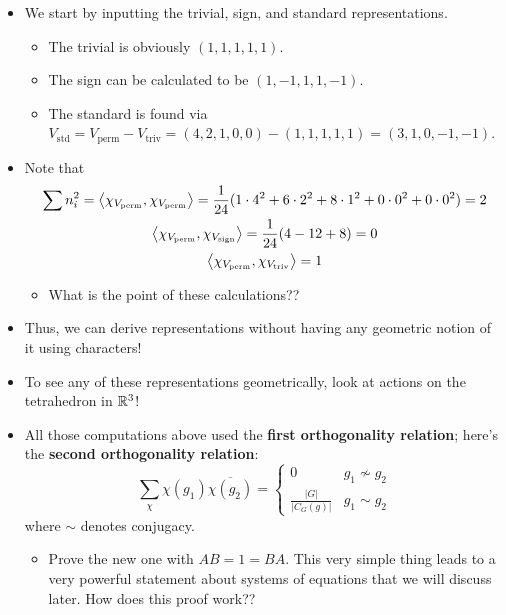 \documentclass[../notes.tex]{subfiles}
\begin{document}
\begin{itemize}
\begin{itemize}
\begin{itemize}
        \end{itemize}
        \item We start by inputting the trivial, sign, and standard representations.
        \begin{itemize}
            \item The trivial is obviously $(1,1,1,1,1)$.
            \item The sign can be calculated to be $(1,-1,1,1,-1)$.
            \item The standard is found via $V_\text{std}=V_\text{perm}-V_\text{triv}=(4,2,1,0,0)-(1,1,1,1,1)=(3,1,0,-1,-1)$.
        \end{itemize}
        \item Note that
        \begin{gather*}
            \sum n_i^2 = \left\langle{\chi_{V_\text{perm}},\chi_{V_\text{perm}}}\right\rangle
                = \frac{1}{24}(1\cdot 4^2+6\cdot 2^2+8\cdot 1^2+0\cdot 0^2+0\cdot 0^2)
                = 2\\
            \left\langle{\chi_{V_\text{perm}},\chi_{V_\text{sign}}}\right\rangle = \frac{1}{24}(4-12+8)
                = 0\\
            \left\langle{\chi_{V_\text{perm}},\chi_{V_\text{triv}}}\right\rangle = 1
        \end{gather*}
        \begin{itemize}
            \item What is the point of these calculations??
        \end{itemize}
        \item Thus, we can derive representations without having any geometric notion of it using characters!
        \item To see any of these representations geometrically, look at actions on the tetrahedron in $\mathbb{R}^3$!
        \item All those computations above used the \textbf{first orthogonality relation}; here's the \textbf{second orthogonality relation}:
        \begin{equation*}
            \sum_\chi\chi(g_1)\overline{\chi(g_2)} =
            \begin{cases}
                0 & g_1\nsim g_2\\
                \frac{|G|}{|C_G(g)|} & g_1\sim g_2
            \end{cases}
        \end{equation*}
        where $\sim$ denotes conjugacy.
        \begin{itemize}
            \item Prove the new one with $AB=1=BA$. This very simple thing leads to a very powerful statement about systems of equations that we will discuss later. How does this proof work??

\end{itemize}
\end{itemize}
\end{itemize}
\end{document}
